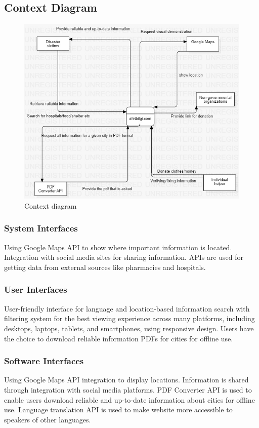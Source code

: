 \documentclass[12pt]{report}
\begin{document}
\subsection{Context Diagram}

\begin{figure}[H]
    \includegraphics[scale=0.5]{context-diagram}
    \centering
    \caption{Context diagram}
\end{figure}

\subsubsection*{System Interfaces}
Using Google Maps API to show where important information is located. Integration with
social media sites for sharing information. APIs are used for getting data from external 
sources like pharmacies and hospitals.

\subsubsection*{User Interfaces}
User-friendly interface for language and location-based information search with filtering system
for the best viewing experience across many platforms, including desktops, laptops, tablets, and
smartphones, using responsive design. Users have the choice to download reliable information PDFs
for cities for offline use.

\subsubsection*{Software Interfaces}
Using Google Maps API integration to display locations. Information is shared through integration
with social media platforms. PDF Converter API is used to enable users download reliable and up-to-date
information about cities for offline use. Language translation API is used to make website more accessible to 
speakers of other languages.
\end{document}
